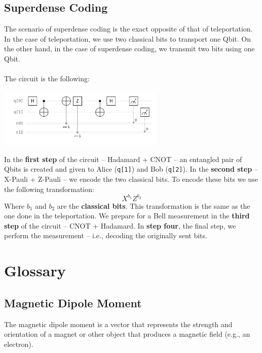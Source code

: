 \documentclass{article}
\begin{document}
\subsection{Superdense Coding}
The scenario of superdense coding is the exact opposite of that of teleportation. In the case of teleportation, we use two classical bits to transport one Qbit. On the other hand, in the case of superdense coding, we transmit two bits using one Qbit. \\ \\
The circuit is the following:
\begin{center}
	\includegraphics[width=8cm]{assets/superdense_circuit.png}
\end{center}
In the \textbf{first step} of the circuit -- Hadamard + CNOT -- an entangled pair of Qbits is created and given to Alice (\verb|q[1]|) and Bob (\verb|q[2]|). In the \textbf{second step} -- X-Pauli + Z-Pauli -- we encode the two classical bits. To encode these bits we use the following transformation:
\[ X^{b_1}Z^{b_2} \]
Where $b_1$ and $b_2$ are the \textbf{classical bits}. This transformation is the same as the one done in the teleportation. We prepare for a Bell measurement in the \textbf{third step} of the circuit -- CNOT + Hadamard. In \textbf{step four}, the final step, we perform the measurement -- i.e., decoding the originally sent bits.























\pagebreak
\section{Glossary}
\subsection{Magnetic Dipole Moment}
The magnetic dipole moment is a vector that represents the strength and orientation of a magnet or other object that produces a magnetic field (e.g., an electron).
\end{document}
